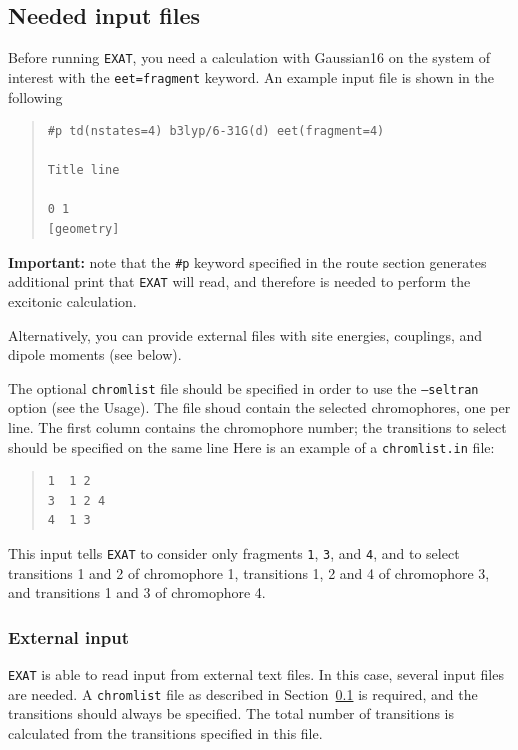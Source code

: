 \documentclass[a4paper,11pt]{article}
\begin{document}
\subsection{Needed input files}\label{sec:input}

Before running \texttt{EXAT}, you need a calculation with Gaussian16 on the system of interest with the \texttt{eet=fragment} keyword. An example input file is shown in the following
\begin{quote}
\begin{verbatim}
#p td(nstates=4) b3lyp/6-31G(d) eet(fragment=4)

Title line

0 1 
[geometry]

\end{verbatim}
\end{quote}

\textbf{Important:} note that the \texttt{\#p} keyword specified in the route section generates additional print that \texttt{EXAT} will read, and therefore is needed to perform the excitonic calculation.

Alternatively, you can provide external files with site energies, couplings, and dipole moments (see below).

The optional \texttt{chromlist} file should be specified in order to use the \texttt{--seltran} option (see the Usage). The file shoud contain the selected chromophores, one per line. The first column contains the chromophore number; the transitions to select should be specified on the same line Here is an example of a \texttt{chromlist.in} file:

\begin{quote}
\begin{verbatim}
1  1 2
3  1 2 4
4  1 3
\end{verbatim}
\end{quote}

This input tells \texttt{EXAT} to consider only fragments \texttt{1}, \texttt{3}, and \texttt{4}, and to select transitions 1 and 2 of chromophore 1, transitions 1, 2 and 4 of chromophore 3, and transitions 1 and 3 of chromophore 4.


\subsubsection{External input}\label{sec:input_ext}

\texttt{EXAT} is able to read input from external text files. In this case, several input files are needed. A \texttt{chromlist} file as described in Section~\ref{sec:input} is required, and the transitions should always be specified. The total number of transitions is calculated from the transitions specified in this file.
\end{document}
